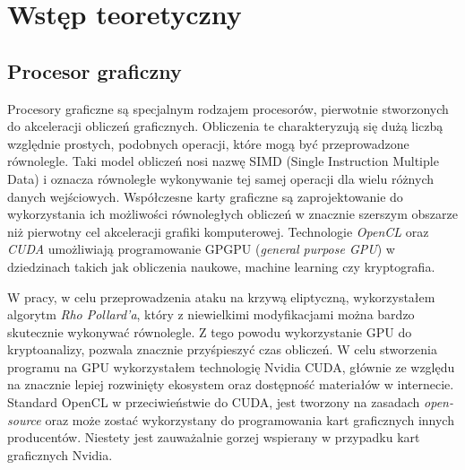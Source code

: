 \newpage
\section{Wstęp teoretyczny}

\subsection{Procesor graficzny}
Procesory graficzne są specjalnym rodzajem procesorów,
pierwotnie stworzonych do akceleracji obliczeń graficznych.
Obliczenia te charakteryzują się dużą liczbą względnie prostych, podobnych operacji,
które mogą być przeprowadzone równolegle.
Taki model obliczeń nosi nazwę SIMD (Single Instruction Multiple Data)
i oznacza równoległe wykonywanie tej samej operacji dla wielu różnych danych wejściowych.
Współczesne karty graficzne są zaprojektowanie do wykorzystania
ich możliwości równoległych obliczeń w znacznie szerszym obszarze niż
pierwotny cel akceleracji grafiki komputerowej.
Technologie \textit{OpenCL} oraz \textit{CUDA} umożliwiają
programowanie GPGPU (\textit{general purpose GPU}) w
dziedzinach takich jak obliczenia naukowe, machine learning czy kryptografia.

\par
W pracy, w celu przeprowadzenia ataku na krzywą eliptyczną, wykorzystałem
algorytm \textit{Rho Pollard'a}, który z niewielkimi modyfikacjami można bardzo skutecznie wykonywać
równolegle. Z tego powodu wykorzystanie GPU do kryptoanalizy, pozwala znacznie przyśpieszyć czas
obliczeń. W celu stworzenia programu na GPU wykorzystałem technologię Nvidia CUDA, głównie ze względu
na znacznie lepiej rozwinięty ekosystem oraz dostępność materiałów w internecie.
Standard OpenCL w przeciwieństwie do CUDA, jest tworzony na zasadach \textit{open-source} oraz może zostać
wykorzystany do programowania kart graficznych innych producentów. Niestety jest zauważalnie
gorzej wspierany w przypadku kart graficznych Nvidia.
\par
